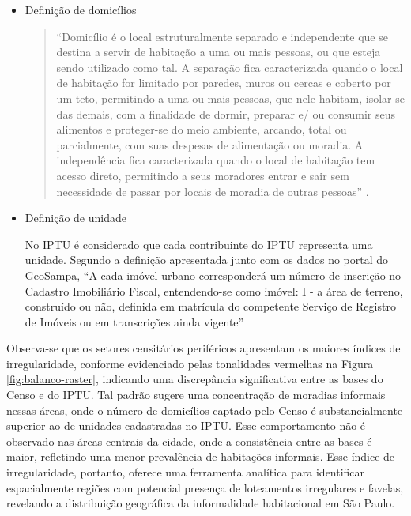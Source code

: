 \begin{apendicesenv}
\begin{itemize}
    \item Definição de domicílios
    
    \begin{quote}
        ``Domicílio é o local estruturalmente separado e independente que se destina a servir de habitação a uma ou mais pessoas, ou que esteja sendo utilizado como tal. A separação fica caracterizada quando o local de habitação for limitado por paredes, muros ou cercas e coberto por um teto, permitindo a uma ou mais pessoas, que nele habitam, isolar-se das demais, com a finalidade de dormir, preparar e/ ou consumir seus alimentos e proteger-se do meio ambiente, arcando, total ou parcialmente, com suas despesas de alimentação ou moradia. A independência fica caracterizada quando o local de habitação tem acesso direto, permitindo a seus moradores entrar e sair sem necessidade de passar por locais de moradia de outras pessoas'' \cite{IBGE2013}.
    \end{quote}

    \item Definição de unidade
    
    No IPTU é considerado que cada contribuinte do IPTU representa uma unidade. Segundo a definição apresentada junto com os dados no portal do GeoSampa, ``A cada imóvel urbano corresponderá um número de inscrição no Cadastro Imobiliário Fiscal, entendendo-se como imóvel: I - a área de terreno, construído ou não, definida em matrícula do competente Serviço de Registro de Imóveis ou em transcrições ainda vigente''
\end{itemize}


Observa-se que os setores censitários periféricos apresentam os maiores índices de irregularidade, conforme evidenciado pelas tonalidades vermelhas na Figura \ref{fig:balanco-raster}, indicando uma discrepância significativa entre as bases do Censo e do IPTU. Tal padrão sugere uma concentração de moradias informais nessas áreas, onde o número de domicílios captado pelo Censo é substancialmente superior ao de unidades cadastradas no IPTU. Esse comportamento não é observado nas áreas centrais da cidade, onde a consistência entre as bases é maior, refletindo uma menor prevalência de habitações informais. Esse índice de irregularidade, portanto, oferece uma ferramenta analítica para identificar espacialmente regiões com potencial presença de loteamentos irregulares e favelas, revelando a distribuição geográfica da informalidade habitacional em São Paulo.


\end{apendicesenv}
